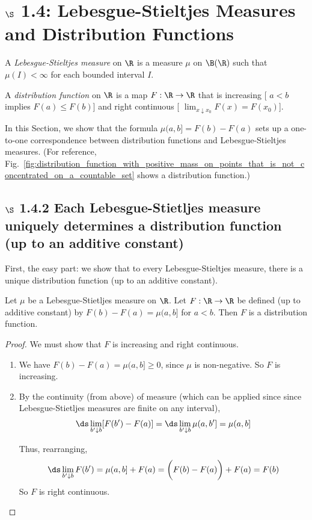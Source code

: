 \documentclass{article} %
\newif\ifActive
\begin{document}
 \section{$\S$ 1.4: Lebesgue-Stieltjes Measures and Distribution Functions} \label{sec:ls_measures_and_distribution_functions}
 
 \begin{definition}
 A \textit{Lebesgue-Stieltjes measure} on $\R$ is a measure $\mu$ on $\B(\R)$ such that $\mu(I) < \infty$ for each bounded interval $I$.	
 \end{definition}

\begin{definition}
 A \textit{distribution function} on $\R$ is a map $F : \R \to \R$ that is increasing [ $a<b$ implies $F(a) \leq F(b)$] and right continuous [ $\lim_{x \downarrow x_0} F(x) = F(x_0)$]. 
 \end{definition}
 

In this Section, we show that the formula $\mu(a,b] = F(b) - F(a)$ sets up a one-to-one correspondence between distribution functions and Lebesgue-Stieltjes measures.  {\tiny (For reference, Fig.~\ref{fig:distribution_function_with_positive_mass_on_points_that_is_not_concentrated_on_a_countable_set} shows a distribution function.)}
 
 \subsection{$\S$ 1.4.2 Each Lebesgue-Stietljes measure uniquely determines a distribution function (up to an additive constant)}
 First, the easy part: we show that to every Lebesgue-Stieltjes  measure, there is a unique distribution function (up to an additive constant). 
 
 \begin{theorem}
 Let $\mu$ be a Lebesgue-Stietljes measure on $\R$.  Let $F : \R \to \R$ be defined (up to additive constant) by $F(b)-F(a) = \mu(a,b]$ for $a<b$. Then $F$ is a distribution function.
 \end{theorem}

\begin{proof}
We must show that $F$ is increasing and right continuous.

\ifActive 
\textbf{Workshop Exercise}: Finish the proof.
\else 
\begin{enumerate}
\item We have $F(b) - F(a) = \mu(a,b] \geq 0$, since $\mu$ is non-negative. So $F$ is increasing.  
\item By the continuity (from above) of measure (which can be applied since since Lebesgue-Stietljes measures are finite on any interval), 
\[ \ds\lim_{b' \downarrow b}[F(b') - F(a)] = \ds\lim_{b' \downarrow b} \mu(a,b'] = \mu(a,b]\]

Thus, rearranging,
\[ \ds\lim_{b' \downarrow b} F(b') = \mu(a,b] + F(a) = \bigg(F(b)-F(a)\bigg) + F(a) = F(b)\]
So $F$ is right continuous.  
\end{enumerate}
\fi 
\end{proof}
\end{document}
